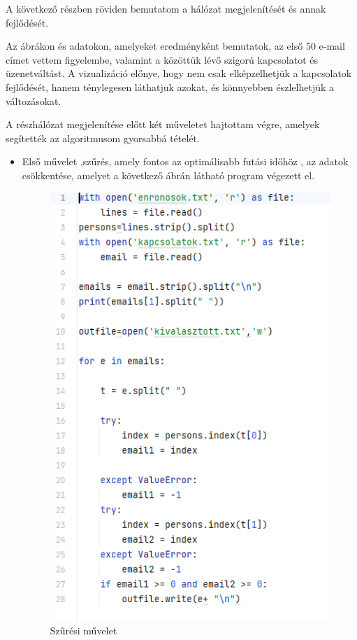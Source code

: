 A következő részben röviden bemutatom a hálózat megjelenítését és annak fejlődését.

Az ábrákon és adatokon, amelyeket eredményként bemutatok, az első 50 e-mail címet vettem figyelembe, valamint a közöttük lévő szigorú kapcsolatot és üzenetváltást. A vizualizáció előnye, hogy nem csak elképzelhetjük a kapcsolatok fejlődését, hanem ténylegesen láthatjuk azokat, és könnyebben észlelhetjük a változásokat.

A részhálózat megjelenítése előtt két műveletet hajtottam végre, amelyek segítették az algoritmusom gyorsabbá tételét.
\begin{itemize}
    \item Első művelet ,szűrés, amely fontos az optimálisabb futási időhöz , az adatok csökkentése, amelyet a következő ábrán látható program végezett el.
    \begin{figure}[!h]
        \centering
        \includegraphics{images/kivalasztas}
        \caption{Szűrési művelet }    
    \end{figure}
    \begin{itemize}

\end{itemize}
\end{itemize}
